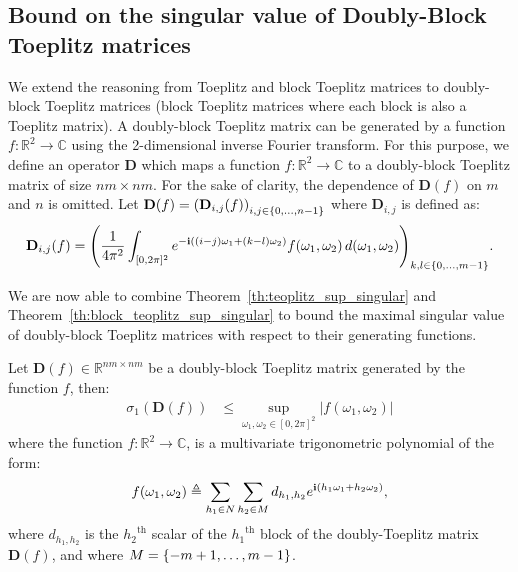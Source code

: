 \subsection{Bound on the singular value of Doubly-Block Toeplitz matrices}
\label{sec:bound_singular_value_doubly_block_toeplitz}

We extend the reasoning from Toeplitz and block Toeplitz matrices to doubly-block Toeplitz matrices (\ie block Toeplitz matrices where each block is also a Toeplitz matrix).
A doubly-block Toeplitz matrix can be generated by a function $f: \mathbb{R}^2 \rightarrow \mathbb{C}$ using the 2-dimensional inverse Fourier transform.
For this purpose, we define an operator $\mathbf{D}$ which maps a function $f: \mathbb{R}^2 \rightarrow \mathbb{C}$ to a doubly-block Toeplitz matrix of size $nm \times nm$.
For the sake of clarity, the dependence of $\mathbf{D}(f)$  on $m$ and $n$ is omitted.
Let $\mathbf{D}(f) =\leftmat\mathbf{D}_{i,j}(f)\rightmat_{i,j\in\{0,\ldots ,n-1\}}$ where $\mathbf{D}_{i,j}$ is defined as:
\begin{equation} \label{eq:doubly_block_toeplitz_operator}
  \mathbf{D}_{i,j}(f) =\leftmat\frac{1}{4\pi^{2}}\int_{[0,2\pi]^{2}}e^{-\mathbf{i}\left((i-j)\omega_{1}+(k-l)\omega_{2}\right)}f(\omega_{1},\omega_{2})\,d(\omega_{1},\omega_{2})\rightmat_{k,l\in\{0,\ldots,m-1\}} .
\end{equation}

We are now able to combine Theorem~\ref{th:teoplitz_sup_singular} and Theorem~\ref{th:block_teoplitz_sup_singular} to bound the maximal singular value of doubly-block Toeplitz matrices with respect to their generating functions. 

\begin{theorem} \label{th:doubly_block_teoplitz_sup_singular}
Let $\mathbf{D}(f) \in \mathbb{R}^{nm \times nm}$ be a doubly-block Toeplitz matrix generated by the function $f$, then:
\begin{align}
  \sigma_{1} \left( \mathbf{D}(f) \right) &\leq \sup_{\omega_1, \omega_2 \in [0, 2\pi]^2}|f(\omega_1,\omega_2)|
\end{align}
where the function $f: \mathbb{R}^2 \rightarrow \mathbb{C}$, is a multivariate trigonometric polynomial of the form:
\begin{equation}\label{eq:muli_variate_poly_on_M}
    f(\omega_1, \omega_2) \triangleq \sum_{h_1 \in N} \sum_{h_2 \in M} d_{h_1, h_2} e^{\mathbf{i} (h_1 \omega_1 + h_2 \omega_2)},
\end{equation}
where $d_{h_{1},h_{2}}$ is the ${h_2}^\textrm{th}$ scalar of the ${h_1}^\textrm{th}$ block of the doubly-Toeplitz matrix $\mathbf{D}(f)$, and where $M = \{-m+1,\dots, m-1 \}$.
\end{theorem}


